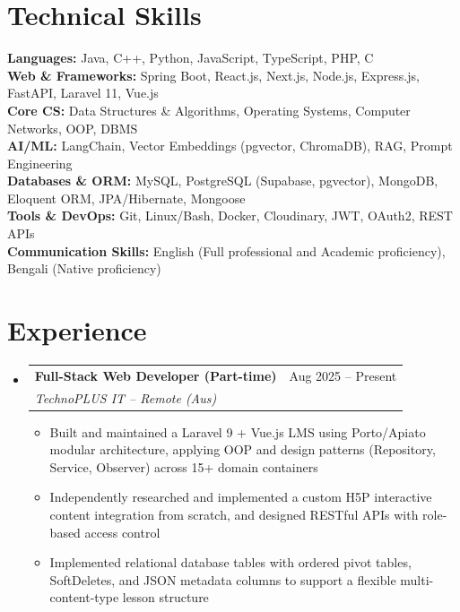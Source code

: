 \documentclass[letterpaper,10.5pt]{article}
\makeatletter
\newcommand{\resumeItem}[1]{%
  \item\small{#1}\par\vspace{-2pt}%
}
\newcommand{\resumeSubheading}[4]{
  \vspace{-2pt}\item
    \begin{tabular*}{\textwidth}[t]{l@{\extracolsep{\fill}}r}
      \textbf{#1} & #2 \\
      \textit{\small#3} & \textit{\small #4} \\
    \end{tabular*}\vspace{-7pt}
}
\newcommand{\resumeSubHeadingListStart}{\begin{itemize}[leftmargin=0.0in, label={}]}
\newcommand{\resumeSubHeadingListEnd}{\end{itemize}}
\newcommand{\resumeItemListStart}{\begin{itemize}[leftmargin=0.15in]}
\newcommand{\resumeItemListEnd}{\end{itemize}\vspace{-5pt}}
\makeatother
\begin{document}
\section{Technical Skills}
 \begin{itemize}[leftmargin=0.0in, label={}]
    \small{\item{
     \textbf{Languages:} Java, C++, Python, JavaScript, TypeScript, PHP, C \\[1pt]
     \textbf{Web \& Frameworks:} Spring Boot, React.js, Next.js, Node.js, Express.js, FastAPI, Laravel 11, Vue.js \\[1pt]
     \textbf{Core CS:} Data Structures \& Algorithms, Operating Systems, Computer Networks, OOP, DBMS \\[1pt]
     \textbf{AI/ML:} LangChain, Vector Embeddings (pgvector, ChromaDB), RAG, Prompt Engineering \\[1pt]
     \textbf{Databases \& ORM:} MySQL, PostgreSQL (Supabase, pgvector), MongoDB, Eloquent ORM, JPA/Hibernate, Mongoose \\[1pt]
     \textbf{Tools \& DevOps:} Git, Linux/Bash, Docker, Cloudinary, JWT, OAuth2, REST APIs \\[1pt]
     \textbf{Communication Skills:} English (Full professional and Academic proficiency), Bengali (Native proficiency)
    }}
 \end{itemize}
\vspace{-8pt}

\section{Experience}
  \resumeSubHeadingListStart
    \resumeSubheading
      {Full-Stack Web Developer (Part-time)}{Aug 2025 -- Present}
      {TechnoPLUS IT -- Remote (Aus)}{}
      \resumeItemListStart
        \resumeItem{Built and maintained a Laravel 9 + Vue.js LMS using Porto/Apiato modular architecture, applying OOP and design patterns (Repository, Service, Observer) across 15+ domain containers}
        \resumeItem{Independently researched and implemented a custom H5P interactive content integration from scratch, and designed RESTful APIs with role-based access control}
        \resumeItem{Implemented relational database tables with ordered pivot tables, SoftDeletes, and JSON metadata columns to support a flexible multi-content-type lesson structure}
      \resumeItemListEnd
  \resumeSubHeadingListEnd
\vspace{-8pt}
\end{document}
